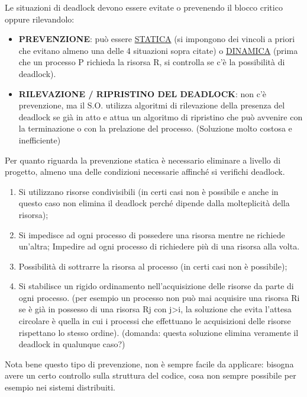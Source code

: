 \documentclass{article}
\begin{document}
\noindent Le situazioni di deadlock devono essere evitate o prevenendo il blocco critico oppure rilevandolo:
\begin{itemize}
    \item \textbf{PREVENZIONE}: può essere \underline{STATICA} (si impongono dei vincoli a priori che evitano almeno una delle 4 situazioni sopra citate)
     o \underline{DINAMICA} (prima che un processo P richieda la risorsa R, si controlla se c'è la possibilità di deadlock). 
    \item \textbf{RILEVAZIONE / RIPRISTINO DEL DEADLOCK}: non c'è prevenzione, ma il S.O. utilizza algoritmi di rilevazione della presenza del
    deadlock se già in atto e attua un algoritmo di ripristino che può avvenire con la terminazione o con la prelazione del processo. 
    (Soluzione molto costosa e inefficiente)
\end{itemize}

\noindent Per quanto riguarda la prevenzione statica è necessario eliminare a livello di progetto, almeno una delle condizioni necessarie 
affinché si verifichi deadlock.

\begin{enumerate}
    \item Si utilizzano risorse condivisibili (in certi casi non è possibile e anche in questo caso non elimina il deadlock perché dipende dalla molteplicità della risorsa);
    \item Si impedisce ad ogni processo di possedere una risorsa mentre ne richiede un'altra; Impedire ad ogni processo di richiedere più di una risorsa alla volta.
    \item Possibilità di sottrarre la risorsa al processo (in certi casi non è possibile);
    \item Si stabilisce un rigido ordinamento nell'acquisizione delle risorse da parte di ogni processo. (per esempio un processo non può mai 
    acquisire una risorsa Ri se è già in possesso di una risorsa Rj con j>i, la soluzione che evita l'attesa circolare è quella in
    cui i processi che effettuano le acquisizioni delle risorse rispettano lo stesso ordine). (domanda: questa soluzione elimina veramente il deadlock in qualunque caso?)
\end{enumerate}

\noindent Nota bene questo tipo di prevenzione, non è sempre facile da applicare: bisogna avere un certo controllo sulla struttura del 
codice, cosa non sempre possibile per esempio nei sistemi distribuiti.
\medskip
\end{document}
